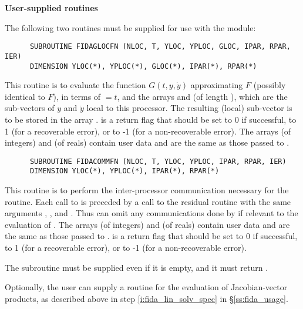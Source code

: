 \begin{Steps}

\item {\bf User-supplied routines}

  The following two routines must be supplied for use with the {\idabbdpre}
  module:
\begin{verbatim}
      SUBROUTINE FIDAGLOCFN (NLOC, T, YLOC, YPLOC, GLOC, IPAR, RPAR, IER)
      DIMENSION YLOC(*), YPLOC(*), GLOC(*), IPAR(*), RPAR(*)
\end{verbatim}
  This routine is to evaluate the function $G(t,y,\dot{y})$ approximating $F$
  (possibly identical to $F$), in terms of  $ = t$, and the arrays
   and  (of length ), which are the sub-vectors
  of $y$ and $\dot{y}$ local to this processor.  The resulting (local) sub-vector
  is to be stored in the array .   is a return flag that
  should be set to 0 if successful, to 1 (for a recoverable error), or to
  -1 (for a non-recoverable error).
  The arrays  (of integers) and  (of reals) contain user data
  and are the same as those passed to .

\begin{verbatim}
      SUBROUTINE FIDACOMMFN (NLOC, T, YLOC, YPLOC, IPAR, RPAR, IER)
      DIMENSION YLOC(*), YPLOC(*), IPAR(*), RPAR(*)
\end{verbatim}
  This routine is to perform the inter-processor communication necessary
  for the  routine.
  Each call to  is preceded by a call to the residual routine
   with the same arguments , , and .
  Thus  can omit any communications done by  if
  relevant to the evaluation of .
  The arrays  (of integers) and  (of reals) contain user data
  and are the same as those passed to .
   is a return flag that should be set to 0 if successful, to 1
  (for a recoverable error), or to -1 (for a non-recoverable error).

  {\warn}The subroutine  must be supplied even if it is empty,
  and it must return .

  Optionally, the user can supply a routine  for the evaluation of
  Jacobian-vector products, as described above in step \ref{i:fida_lin_solv_spec}
  in \S\ref{ss:fida_usage}.

\end{Steps}
